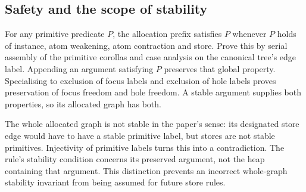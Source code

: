 





\subsection{Safety and the scope of stability}

For any primitive predicate $P$, the allocation prefix satisfies $P$
whenever $P$ holds of instance, atom weakening, atom contraction and store.
Prove this by serial assembly of the primitive corollas and case analysis on
the canonical tree's edge label. Appending an argument satisfying $P$ preserves
that global property. Specialising to exclusion of focus labels and exclusion
of hole labels proves preservation of focus freedom and hole freedom.
A stable argument supplies both properties, so its allocated graph has both.

The whole allocated graph is not stable in the paper's sense: its designated
store edge would have to have a stable primitive label, but stores are not
stable primitives. Injectivity of primitive labels turns this into a
contradiction. The rule's stability condition concerns its preserved argument,
not the heap containing that argument. This distinction prevents an incorrect
whole-graph stability invariant from being assumed for future store rules.







